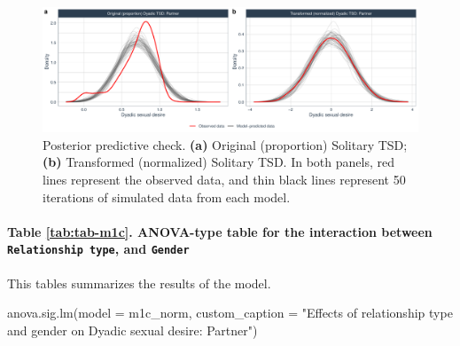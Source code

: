 \documentclass[
  bookmarksnumbered]{article}
\newenvironment{Shaded}{\begin{snugshade}}{\end{snugshade}}
\newcommand{\AttributeTok}[1]{\textcolor[rgb]{0.80,0.80,0.80}{#1}}
\newcommand{\FunctionTok}[1]{\textcolor[rgb]{0.94,0.94,0.56}{#1}}
\newcommand{\NormalTok}[1]{\textcolor[rgb]{0.80,0.80,0.80}{#1}}
\newcommand{\StringTok}[1]{\textcolor[rgb]{0.80,0.58,0.58}{#1}}
\begin{document}
\begin{figure}
\centering
\includegraphics{Sexual_Desire_Arousal_V2_files/figure-latex/ppc-m1c-1.pdf}
\caption{\label{fig:ppc-m1c}Posterior predictive check. \textbf{(a)} Original (proportion) Solitary TSD; \textbf{(b)} Transformed (normalized) Solitary TSD. In both panels, red lines represent the observed data, and thin black lines represent 50 iterations of simulated data from each model.}
\end{figure}

\paragraph{\texorpdfstring{Table \ref{tab:tab-m1c}. ANOVA-type table for the interaction between \texttt{Relationship\ type}, and \texttt{Gender}}{Table \ref{tab:tab-m1c}. ANOVA-type table for the interaction between Relationship type, and Gender}}\label{table-reftabtab-m1c.-anova-type-table-for-the-interaction-between-relationship-type-and-gender}

This tables summarizes the results of the model.

\begin{Shaded}
\begin{Highlighting}[]
\FunctionTok{anova.sig.lm}\NormalTok{(}\AttributeTok{model =}\NormalTok{ m1c\_norm, }\AttributeTok{custom\_caption =} \StringTok{"Effects of relationship type and gender on }
\StringTok{          Dyadic sexual desire: Partner"}\NormalTok{)}
\end{Highlighting}
\end{Shaded}
\end{document}
